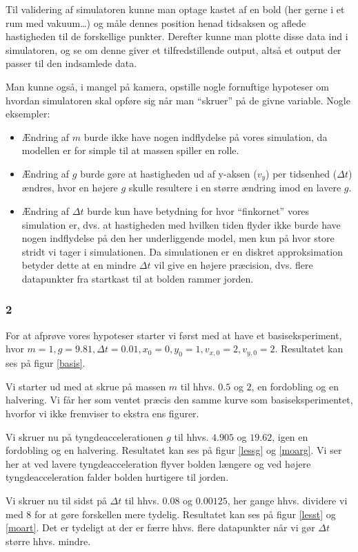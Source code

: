 Til validering af simulatoren kunne man optage kastet af en bold (her gerne i et rum med vakuum\ldots)
og måle dennes position henad tidsaksen og aflede hastigheden til de forskellige punkter.
Derefter kunne man plotte disse data ind i simulatoren, og se om denne giver et tilfredstillende output,
altså et output der passer til den indsamlede data.

Man kunne også, i mangel på kamera, opstille nogle fornuftige hypoteser om hvordan simulatoren skal
opføre sig når man ``skruer'' på de givne variable. Nogle eksempler:
\begin{itemize}
\item Ændring af $m$ burde ikke have nogen indflydelse på vores simulation, da modellen er for simple
til at massen spiller en rolle.
\item Ændring af $g$ burde gøre at hastigheden ud af y-aksen ($v_y$) per tidsenhed ($\Delta t$) ændres,
hvor en højere $g$ skulle resultere i en større ændring imod en lavere $g$.
\item Ændring af $\Delta t$ burde kun have betydning for hvor ``finkornet'' vores simulation er, dvs.
at hastigheden med hvilken tiden flyder ikke burde have nogen indflydelse på den her underliggende
model, men kun på hvor store stridt vi tager i simulationen.
Da simulationen er en diskret approksimation betyder dette at en mindre $\Delta t$ vil give en højere
præcision, dvs. flere datapunkter fra startkast til at bolden rammer jorden.
\end{itemize} 
\subsubsection*{2}
For at afprøve vores hypoteser starter vi først med at have et basiseksperiment,
hvor $m = 1, g = 9.81, \Delta t = 0.01, x_0 = 0, y_0 = 1, v_{x,0} = 2, v_{y,0} = 2$.
Resultatet kan ses på figur \ref{basis}.

Vi starter ud med at skrue på massen $m$ til hhvs. $0.5$ og $2$, en fordobling og en halvering.
Vi får her som ventet præcis den samme kurve som basiseksperimentet, hvorfor vi ikke fremviser
to ekstra ens figurer.

Vi skruer nu på tyngdeaccelerationen $g$ til hhvs. $4.905$ og $19.62$, igen en fordobling og en halvering.
Resultatet kan ses på figur \ref{lessg} og \ref{moarg}.
Vi ser her at ved lavere tyngdeacceleration flyver bolden længere og ved højere tyngdeacceleration falder
bolden hurtigere til jorden.

Vi skruer nu til sidst på $\Delta t$ til hhvs. $0.08$ og $0.00125$, her gange hhvs. dividere vi med 8 for
at gøre forskellen mere tydelig.
Resultatet kan ses på figur \ref{lesst} og \ref{moart}.
Det er tydeligt at der er færre hhvs. flere datapunkter når vi gør $\Delta t$ større hhvs. mindre.

